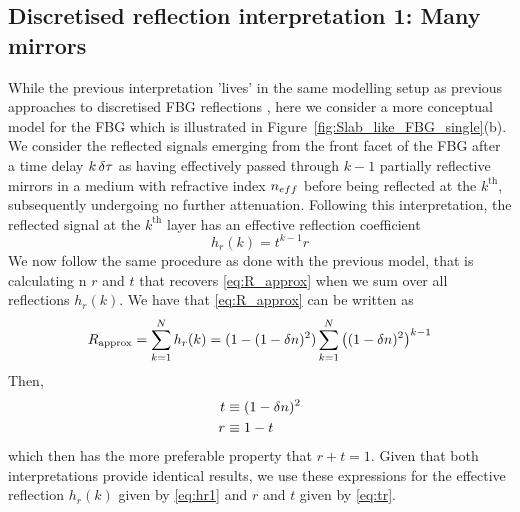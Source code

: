 \subsection{Discretised reflection interpretation 1: Many mirrors}
%
While the previous interpretation 'lives' in the same modelling setup as previous approaches to discretised FBG reflections \cite{ghiringhelli2002time, capmany2007synthesis}, here we consider a more conceptual model for the FBG which is illustrated in Figure~\ref{fig:Slab_like_FBG_single}(b). We consider the reflected signals emerging from the front facet of the FBG after a time delay $k \, \delta \tau$ as having effectively passed through $k-1$ partially reflective mirrors in a medium with refractive index $n_{eff}$ before being reflected at the $k^\text{th}$, subsequently undergoing no further attenuation. Following this interpretation, the reflected signal at the $k^\text{th}$ layer has an effective reflection coefficient
%
\begin{equation}
    \label{eq:hr1}
    h_r(k) = t^{k-1}r
\end{equation}
%
We now follow the same procedure as done with the previous model, that is calculating n $r$ and $t$ that recovers \eqref{eq:R_approx} when we sum over all reflections $h_r(k)$. We have that \eqref{eq:R_approx} can be written as
%
\begin{equation*}
    R_\text{approx} = \sum_{k=1}^{N} h_r(k) = (1-(1-\delta n)^2)\sum_{k=1}^{N} \left((1-\delta n)^2\right)^{k-1}
\end{equation*}
%
Then,
%
\begin{align}
    \label{eq:tr}
    t &\equiv (1-\delta n)^2
    \\
    r &\equiv 1-t
\end{align}
%
which then has the more preferable property that $r+t=1$. Given that both interpretations provide identical results, we use these expressions for the effective reflection $h_r(k)$ given by \eqref{eq:hr1} and $r$ and $t$ given by \eqref{eq:tr}. 
%
%
